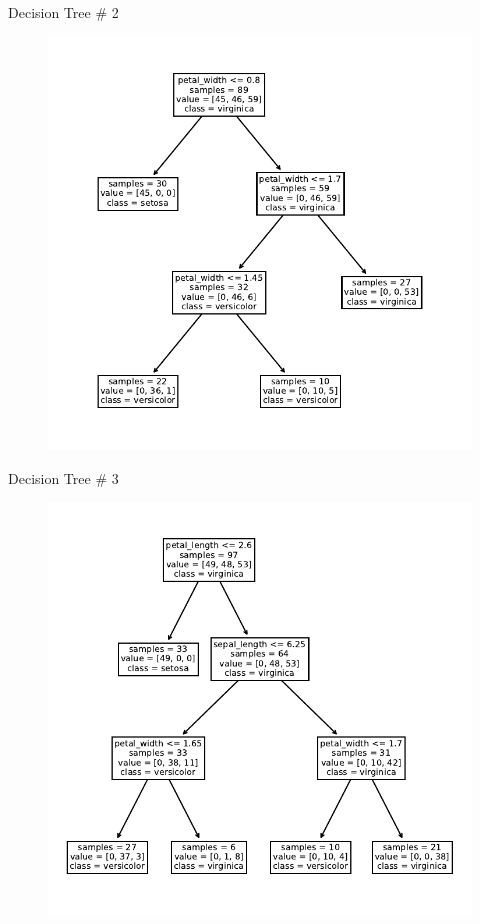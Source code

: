 \documentclass{beamer}
\begin{document}
\begin{frame}{Decision Tree \# 2}
\begin{figure}
\includegraphics[scale=0.7]{tree-2.pdf}
\end{figure}
\end{frame}


\begin{frame}{Decision Tree \# 3}
\begin{figure}
\includegraphics[scale=0.7]{tree-3.pdf}
\end{figure}
\end{frame}
\end{document}
